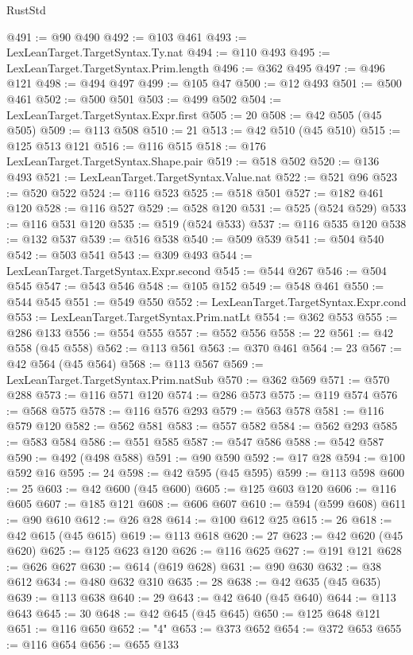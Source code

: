 \begin{lexlean}{RustStd}
\begin{coremodule}
@491 := @90 @490
@492 := @103 @461
@493 := LexLeanTarget.TargetSyntax.Ty.nat
@494 := @110 @493
@495 := LexLeanTarget.TargetSyntax.Prim.length
@496 := @362 @495
@497 := @496 @121
@498 := @494 @497
@499 := @105 @47
@500 := @12 @493
@501 := @500 @461
@502 := @500 @501
@503 := @499 @502
@504 := LexLeanTarget.TargetSyntax.Expr.first
@505 := 20
@508 := @42 @505 (@45 @505)
@509 := @113 @508
@510 := 21
@513 := @42 @510 (@45 @510)
@515 := @125 @513 @121
@516 := @116 @515
@518 := @176 LexLeanTarget.TargetSyntax.Shape.pair
@519 := @518 @502
@520 := @136 @493
@521 := LexLeanTarget.TargetSyntax.Value.nat
@522 := @521 @96
@523 := @520 @522
@524 := @116 @523
@525 := @518 @501
@527 := @182 @461 @120
@528 := @116 @527
@529 := @528 @120
@531 := @525 (@524 @529)
@533 := @116 @531 @120
@535 := @519 (@524 @533)
@537 := @116 @535 @120
@538 := @132 @537
@539 := @516 @538
@540 := @509 @539
@541 := @504 @540
@542 := @503 @541
@543 := @309 @493
@544 := LexLeanTarget.TargetSyntax.Expr.second
@545 := @544 @267
@546 := @504 @545
@547 := @543 @546
@548 := @105 @152
@549 := @548 @461
@550 := @544 @545
@551 := @549 @550
@552 := LexLeanTarget.TargetSyntax.Expr.cond
@553 := LexLeanTarget.TargetSyntax.Prim.natLt
@554 := @362 @553
@555 := @286 @133
@556 := @554 @555
@557 := @552 @556
@558 := 22
@561 := @42 @558 (@45 @558)
@562 := @113 @561
@563 := @370 @461
@564 := 23
@567 := @42 @564 (@45 @564)
@568 := @113 @567
@569 := LexLeanTarget.TargetSyntax.Prim.natSub
@570 := @362 @569
@571 := @570 @288
@573 := @116 @571 @120
@574 := @286 @573
@575 := @119 @574
@576 := @568 @575
@578 := @116 @576 @293
@579 := @563 @578
@581 := @116 @579 @120
@582 := @562 @581
@583 := @557 @582
@584 := @562 @293
@585 := @583 @584
@586 := @551 @585
@587 := @547 @586
@588 := @542 @587
@590 := @492 (@498 @588)
@591 := @90 @590
@592 := @17 @28
@594 := @100 @592 @16
@595 := 24
@598 := @42 @595 (@45 @595)
@599 := @113 @598
@600 := 25
@603 := @42 @600 (@45 @600)
@605 := @125 @603 @120
@606 := @116 @605
@607 := @185 @121
@608 := @606 @607
@610 := @594 (@599 @608)
@611 := @90 @610
@612 := @26 @28
@614 := @100 @612 @25
@615 := 26
@618 := @42 @615 (@45 @615)
@619 := @113 @618
@620 := 27
@623 := @42 @620 (@45 @620)
@625 := @125 @623 @120
@626 := @116 @625
@627 := @191 @121
@628 := @626 @627
@630 := @614 (@619 @628)
@631 := @90 @630
@632 := @38 @612
@634 := @480 @632 @310
@635 := 28
@638 := @42 @635 (@45 @635)
@639 := @113 @638
@640 := 29
@643 := @42 @640 (@45 @640)
@644 := @113 @643
@645 := 30
@648 := @42 @645 (@45 @645)
@650 := @125 @648 @121
@651 := @116 @650
@652 := "4"
@653 := @373 @652
@654 := @372 @653
@655 := @116 @654
@656 := @655 @133

\end{coremodule}
\end{lexlean}
